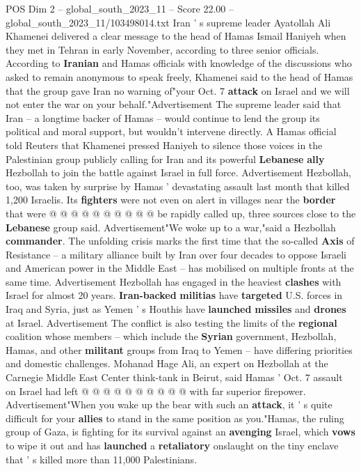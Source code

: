 \begin{textsample}{POS Dim 2 – global\_south\_2023\_11 – Score 22.00 – global\_south\_2023\_11/103498014.txt}  \label{ex:f2_pos_213}
Iran ' s supreme leader Ayatollah Ali Khamenei delivered a clear message to the head of Hamas Ismail Haniyeh when they met in Tehran in early November, according to three senior officials.
According to \textbf{Iranian} and Hamas officials with knowledge of the discussions who asked to remain anonymous to speak freely, Khamenei said to the head of Hamas that the group gave Iran no warning of"your Oct. 7 \textbf{attack} on Israel and we will not enter the war on your behalf."Advertisement The supreme leader said that Iran -- a longtime backer of Hamas -- would continue to lend the group its political and moral support, but wouldn't intervene directly.
A Hamas official told Reuters that Khamenei pressed Haniyeh to silence those voices in the Palestinian group publicly calling for Iran and its powerful \textbf{Lebanese} \textbf{ally} Hezbollah to join the battle against Israel in full force.
Advertisement Hezbollah, too, was taken by surprise by Hamas ' devastating assault last month that killed 1,200 Israelis.
Its \textbf{fighters} were not even on alert in villages near the \textbf{border} that were @ @ @ @ @ @ @ @ @ @ be rapidly called up, three sources close to the \textbf{Lebanese} group said.
Advertisement"We woke up to a war,"said a Hezbollah \textbf{commander}.
The unfolding crisis marks the first time that the so-called \textbf{Axis} of Resistance -- a military alliance built by Iran over four decades to oppose Israeli and American power in the Middle East -- has mobilised on multiple fronts at the same time.
Advertisement Hezbollah has engaged in the heaviest \textbf{clashes} with Israel for almost 20 years. \textbf{Iran-backed} \textbf{militias} have \textbf{targeted} U.S. forces in Iraq and Syria, just as Yemen ' s Houthis have \textbf{launched} \textbf{missiles} and \textbf{drones} at Israel.
Advertisement The conflict is also testing the limits of the \textbf{regional} coalition whose members -- which include the \textbf{Syrian} government, Hezbollah, Hamas, and other \textbf{militant} groups from Iraq to Yemen -- have differing priorities and domestic challenges.
Mohanad Hage Ali, an expert on Hezbollah at the Carnegie Middle East Center think-tank in Beirut, said Hamas ' Oct. 7 assault on Israel had left @ @ @ @ @ @ @ @ @ @ with far superior firepower.
Advertisement"When you wake up the bear with such an \textbf{attack}, it ' s quite difficult for your \textbf{allies} to stand in the same position as you."Hamas, the ruling group of Gaza, is fighting for its survival against an \textbf{avenging} Israel, which \textbf{vows} to wipe it out and has \textbf{launched} a \textbf{retaliatory} onslaught on the tiny enclave that ' s killed more than 11,000 Palestinians.

\end{textsample}

